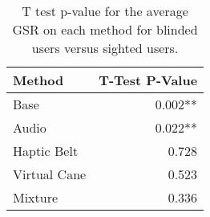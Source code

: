 
\begin{table}[!htb]
\centering
\caption{T test p-value for the average GSR on each method for blinded users versus sighted users.}
\label{tab:ttest_gsr_avg}
\begin{tabular}{lr}
\toprule
      Method & T-Test P-Value \\
\midrule
        Base &        0.002** \\
       Audio &        0.022** \\
 Haptic Belt &          0.728 \\
Virtual Cane &          0.523 \\
     Mixture &          0.336 \\
\bottomrule
\end{tabular}
\end{table}

